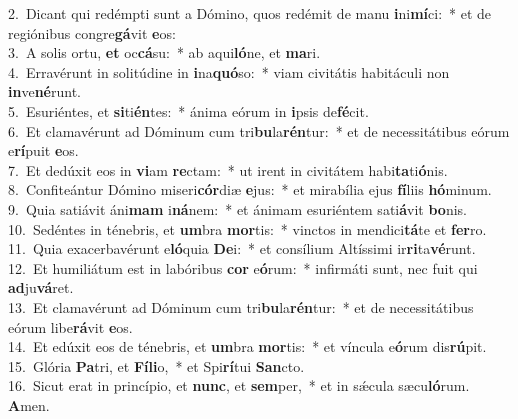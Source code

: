{2.~}Dicant qui redémpti sunt a Dómino, quos redémit de manu \textbf{i}ni\textbf{mí}ci:~* et de regiónibus congre\textbf{gá}vit \textbf{e}os:\\
{3.~}A solis ortu, \textbf{et} oc\textbf{cá}su:~* ab aqui\textbf{ló}ne, et \textbf{ma}ri.\\
{4.~}Erravérunt in solitúdine in \textbf{i}na\textbf{quó}so:~* viam civitátis habitáculi non \textbf{in}ve\textbf{né}runt.\\
{5.~}Esuriéntes, et \textbf{si}ti\textbf{én}tes:~* ánima eórum in \textbf{i}psis de\textbf{fé}cit.\\
{6.~}Et clamavérunt ad Dóminum cum tri\textbf{bu}la\textbf{rén}tur:~* et de necessitátibus eórum e\textbf{rí}puit \textbf{e}os.\\
{7.~}Et dedúxit eos in \textbf{vi}am \textbf{re}ctam:~* ut irent in civitátem habi\textbf{ta}ti\textbf{ó}nis.\\
{8.~}Confiteántur Dómino miseri\textbf{cór}diæ \textbf{e}jus:~* et mirabília ejus \textbf{fí}liis \textbf{hó}minum.\\
{9.~}Quia satiávit áni\textbf{mam} i\textbf{ná}nem:~* et ánimam esuriéntem sati\textbf{á}vit \textbf{bo}nis.\\
{10.~}Sedéntes in ténebris, et \textbf{um}bra \textbf{mor}tis:~* vinctos in mendici\textbf{tá}te et \textbf{fer}ro.\\
{11.~}Quia exacerbavérunt e\textbf{ló}quia \textbf{De}i:~* et consílium Altíssimi ir\textbf{ri}ta\textbf{vé}runt.\\
{12.~}Et humiliátum est in labóribus \textbf{cor} e\textbf{ó}rum:~* infirmáti sunt, nec fuit qui \textbf{ad}ju\textbf{vá}ret.\\
{13.~}Et clamavérunt ad Dóminum cum tri\textbf{bu}la\textbf{rén}tur:~* et de necessitátibus eórum libe\textbf{rá}vit \textbf{e}os.\\
{14.~}Et edúxit eos de ténebris, et \textbf{um}bra \textbf{mor}tis:~* et víncula e\textbf{ó}rum dis\textbf{rú}pit.\\
{15.~}Glória \textbf{Pa}tri, et \textbf{Fí}\textbf{li}o,~* et Spi\textbf{rí}tui \textbf{San}cto.\\
{16.~}Sicut erat in princípio, et \textbf{nunc}, et \textbf{sem}per,~* et in sǽcula sæcu\textbf{ló}rum. \textbf{A}men.\\
